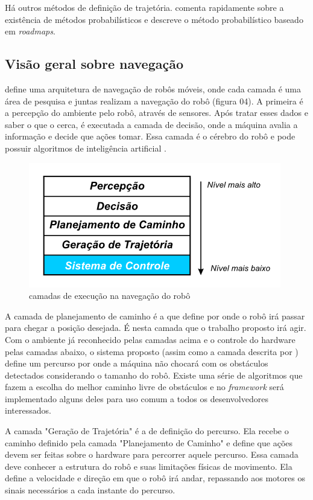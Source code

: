 Há outros métodos de definição de trajetória. \cite{Guzman2008} comenta rapidamente sobre a existência de métodos probabilísticos e \cite{Strandberg2004} descreve o método probabilístico baseado em \textit{roadmaps}.

\subsection{Visão geral sobre navegação}

\cite{Vieira2005} define uma arquitetura de navegação de robôs móveis, onde cada camada é uma área de pesquisa e juntas realizam a navegação do robô (figura 04). A primeira é a percepção do ambiente pelo robô, através de sensores. Após tratar esses dados e saber o que o cerca, é executada a camada de decisão, onde a máquina avalia a informação e decide que ações tomar. Essa camada é o cérebro do robô e pode possuir algoritmos de inteligência artificial	.

\begin{figure}[h]
	\centering
	\label{fig04}
		\includegraphics[keepaspectratio=true,scale=1]{figuras/arqRoboMoveis0.png}
	\caption{camadas de execução na navegação do robô \cite{Vieira2005}}
\end{figure}

A camada de planejamento de caminho é a que define por onde o robô irá passar para chegar a posição desejada. É nesta camada que o trabalho proposto irá agir. Com o ambiente já reconhecido pelas camadas acima e o controle do hardware pelas camadas abaixo, o sistema proposto (assim como a camada descrita por \cite{Vieira2005}) define um percurso por onde a máquina não chocará com os obstáculos detectados considerando o tamanho do robô. Existe uma série de algoritmos que fazem a  escolha do melhor caminho livre de obstáculos e no \textit{framework} será implementado alguns deles para uso comum a todos os desenvolvedores interessados.

A camada "Geração de Trajetória" é a de definição do percurso. Ela recebe o caminho definido pela camada "Planejamento de Caminho" e define que ações devem ser feitas sobre o hardware para percorrer aquele percurso. Essa camada deve conhecer a estrutura do robô e suas limitações físicas de movimento. Ela define a velocidade e direção em que o robô irá andar, repassando aos motores os sinais necessários a cada instante do percurso. 

